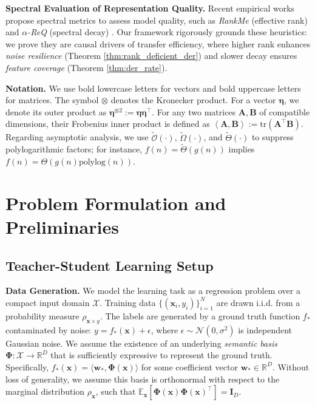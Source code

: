 \documentclass{article}
\theoremstyle{definition}
\theoremstyle{definition}
\theoremstyle{plain}
\theoremstyle{plain}
\theoremstyle{plain}
\theoremstyle{plain}
\theoremstyle{plain}
\newcommand{\tr}{\mathrm{tr}}
\newcommand{\inner}[1]{\left\langle#1\right\rangle}
\begin{document}
\textbf{Spectral Evaluation of Representation Quality.} 
Recent empirical works propose spectral metrics to assess model quality, such as \emph{RankMe} (effective rank) \citep{garrido2023rankmeassessingdownstreamperformance} and \emph{$\alpha$-ReQ} (spectral decay) \citep{Agrawal2022alphaReQA}. 
Our framework rigorously grounds these heuristics: we prove they are causal drivers of transfer efficiency, where higher rank enhances \emph{noise resilience} (Theorem \ref{thm:rank_deficient_der}) and slower decay ensures \emph{feature coverage} (Theorem \ref{thm:der_rate}).


\textbf{Notation.}
We use bold lowercase letters for vectors and bold uppercase letters for matrices.
The symbol $\otimes$ denotes the Kronecker product.
For a vector $\boldsymbol{\eta}$, we denote its outer product as $\boldsymbol{\eta}^{\otimes 2} := \boldsymbol{\eta}\boldsymbol{\eta}^\top$.
For any two matrices $\mathbf{A}, \mathbf{B}$ of compatible dimensions, their Frobenius inner product is defined as $\inner{\mathbf{A}, \mathbf{B}} := \tr(\mathbf{A}^\top \mathbf{B})$.
Regarding asymptotic analysis, we use $\tilde{\mathcal{O}}(\cdot)$, $\tilde{\Omega}(\cdot)$, and $\tilde{\Theta}(\cdot)$ to suppress polylogarithmic factors; for instance, $f(n) = \tilde{\Theta}(g(n))$ implies $f(n) = \Theta(g(n) \text{polylog}(n))$.


\section{Problem Formulation and Preliminaries}
\label{sec:preliminaries}

\subsection{Teacher-Student Learning Setup}
\label{subsec:T2S_setup}

\textbf{Data Generation.}
We model the learning task as a regression problem over a compact input domain $\mathcal{X}$. Training data $\{(\mathbf{x}_i, y_i)\}_{i=1}^N$ are drawn i.i.d. from a probability measure $\rho_{\mathbf{x}\times y}$. The labels are generated by a ground truth function $f_*$ contaminated by noise: $y = f_*(\mathbf{x}) + \epsilon$, where $\epsilon \sim \mathcal{N}(0, \sigma^2)$ is independent Gaussian noise.
We assume the existence of an underlying \textit{semantic basis} $\mathbf{\Phi}: \mathcal{X} \to \mathbb{R}^D$ that is sufficiently expressive to represent the ground truth. Specifically, $f_*(\mathbf{x}) = \langle \mathbf{w}_*, \mathbf{\Phi}(\mathbf{x}) \rangle$ for some coefficient vector $\mathbf{w}_* \in \mathbb{R}^D$. Without loss of generality, we assume this basis is orthonormal with respect to the marginal distribution $\rho_{\mathbf{x}}$, such that $\mathbb{E}_{\mathbf{x}}[\mathbf{\Phi}(\mathbf{x})\mathbf{\Phi}(\mathbf{x})^\top] = \mathbf{I}_D$.
\end{document}
